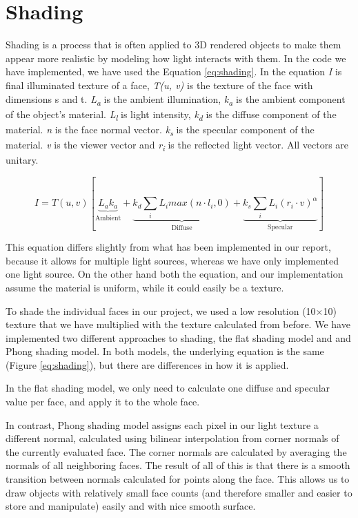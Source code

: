 \section{Shading}

Shading is a process that is often applied to 3D rendered objects to make them appear more realistic by modeling  how light interacts with them. In the code we have implemented, we have used the Equation \ref{eq:shading}. In the equation \textit{I} is final illuminated texture of a face, \textit{T(u, v)} is the texture of the face with dimensions s and t. \textit{L\textsubscript{a}} is the ambient illumination, \textit{k\textsubscript{a}} is the ambient component of the object's material. \textit{L\textsubscript{l}} is light intensity, \textit{k\textsubscript{d}} is the diffuse component of the material. \textit{n} is the face normal vector. \textit{k\textsubscript{s}} is the specular component of the material. \textit{v} is the viewer vector and \textit{r\textsubscript{i}} is the reflected light vector. All vectors are unitary.

\begin{equation}
	I=T(u,v)[
	\underbrace{
	L_{a}k_{a}
	}_\text{Ambient}
	+
	\underbrace{
	k_{d}\sum\limits_{i}L_{i}max(n\cdot l_{i},0)
	}_\text{Diffuse}
	+
	\underbrace{
	k_{s}\sum\limits_{i}L_{i}(r_{i}\cdot v)^\alpha
	  }_\text{Specular}
	]
	\label{eq:shading}
\end{equation}

This equation differs slightly from what has been implemented in our report, because it allows for multiple light sources, whereas we have only implemented one light source. On the other hand both the equation, and our implementation assume the material is uniform, while it could easily be a texture.

To shade the individual faces in our project, we used a low resolution (10$\times$10) texture that we have multiplied with the texture calculated from before. We have implemented two different approaches to shading, the flat shading model and and Phong shading model. In both models, the underlying equation is the same (Figure \ref{eq:shading}), but there are differences in how it is applied.

In the flat shading model, we only need to calculate one diffuse and specular value per face, and apply it to the whole face.

In contrast, Phong shading model assigns each pixel in our light texture a different normal, calculated using bilinear interpolation from corner normals of the currently evaluated face. The corner normals are calculated by averaging the normals of all neighboring faces. The result of all of this is that there is a smooth transition between normals calculated for points along the face. This allows us to draw objects with relatively small face counts (and therefore smaller and easier to store and manipulate) easily and with nice smooth surface. 

